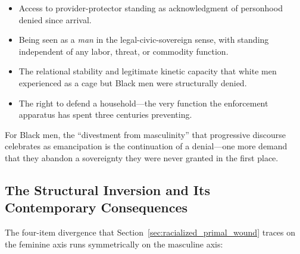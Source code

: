 \begin{itemize}
    \item Access to provider-protector standing as acknowledgment of personhood denied since arrival.
    \item Being seen as a \textit{man} in the legal-civic-sovereign sense, with standing independent of any labor, threat, or commodity function.
    \item The relational stability and legitimate kinetic capacity that white men experienced as a cage but Black men were structurally denied.
    \item The right to defend a household---the very function the enforcement apparatus has spent three centuries preventing.
\end{itemize}

For Black men, the ``divestment from masculinity'' that progressive discourse celebrates as emancipation is the continuation of a denial---one more demand that they abandon a sovereignty they were never granted in the first place.

\subsection{The Structural Inversion and Its Contemporary Consequences}

The four-item divergence that Section~\ref{sec:racialized_primal_wound} traces on the feminine axis runs symmetrically on the masculine axis:

